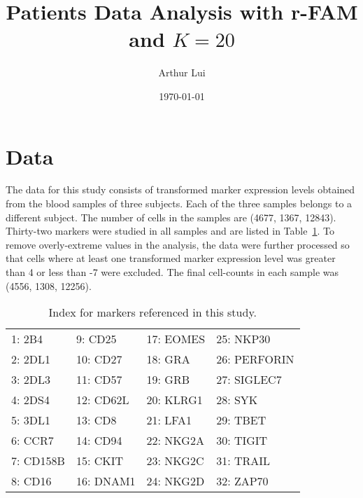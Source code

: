 \documentclass[11pt]{article} %
\title{Patients Data Analysis with r-FAM and $K=20$}
\author{Arthur Lui}
\date{\today} %
\begin{document}
\maketitle



\section{Data}\label{sec:data}
The data for this study consists of transformed marker expression levels
obtained from the blood samples of three subjects. Each of the three samples
belongs to a different subject. The number of cells in the samples are (4677,
1367, 12843). Thirty-two markers were studied in all samples and are listed
in Table~\ref{tab:markers}. To remove overly-extreme values in the analysis,
the data were further processed so that cells where at least one transformed
marker expression level was greater than 4 or less than -7 were excluded. The
final cell-counts in each sample was (4556, 1308, 12256).


\begin{table}[H]
  \begin{center}
    \begin{tabular}{|l|l|l|l|}
      \hline
      1: 2B4    &  9: CD25   &  17: EOMES & 25: NKP30    \\
      2: 2DL1   &  10: CD27  &  18: GRA   & 26: PERFORIN \\
      3: 2DL3   &  11: CD57  &  19: GRB   & 27: SIGLEC7  \\
      4: 2DS4   &  12: CD62L &  20: KLRG1 & 28: SYK      \\   
      5: 3DL1   &  13: CD8   &  21: LFA1  & 29: TBET     \\
      6: CCR7   &  14: CD94  &  22: NKG2A & 30: TIGIT    \\ 
      7: CD158B &  15: CKIT  &  23: NKG2C & 31: TRAIL    \\ 
      8: CD16   &  16: DNAM1 &  24: NKG2D & 32: ZAP70    \\ 
      \hline
    \end{tabular} 
  \end{center}
  \caption{Index for markers referenced in this study.}
  \label{tab:markers}
\end{table}
\end{document}
